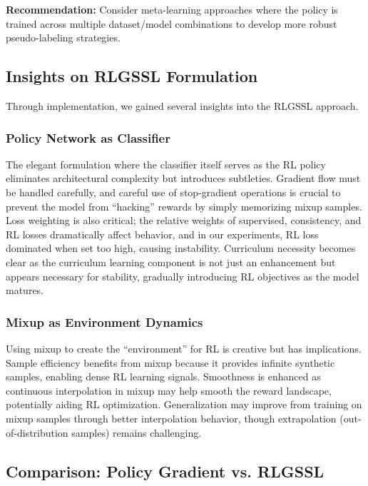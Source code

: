 \documentclass{scrartcl}
\begin{document}
\textbf{Recommendation:} Consider meta-learning approaches where the policy is trained across multiple dataset/model combinations to develop more robust pseudo-labeling strategies.

\subsection{Insights on RLGSSL Formulation}

Through implementation, we gained several insights into the RLGSSL approach.

\subsubsection{Policy Network as Classifier}

The elegant formulation where the classifier itself serves as the RL policy eliminates architectural complexity but introduces subtleties. Gradient flow must be handled carefully, and careful use of stop-gradient operations is crucial to prevent the model from “hacking” rewards by simply memorizing mixup samples. Loss weighting is also critical; the relative weights of supervised, consistency, and RL losses dramatically affect behavior, and in our experiments, RL loss dominated when set too high, causing instability. Curriculum necessity becomes clear as the curriculum learning component is not just an enhancement but appears necessary for stability, gradually introducing RL objectives as the model matures.

\subsubsection{Mixup as Environment Dynamics}

Using mixup to create the “environment” for RL is creative but has implications. Sample efficiency benefits from mixup because it provides infinite synthetic samples, enabling dense RL learning signals. Smoothness is enhanced as continuous interpolation in mixup may help smooth the reward landscape, potentially aiding RL optimization. Generalization may improve from training on mixup samples through better interpolation behavior, though extrapolation (out-of-distribution samples) remains challenging.

\subsection{Comparison: Policy Gradient vs. RLGSSL}
\end{document}
